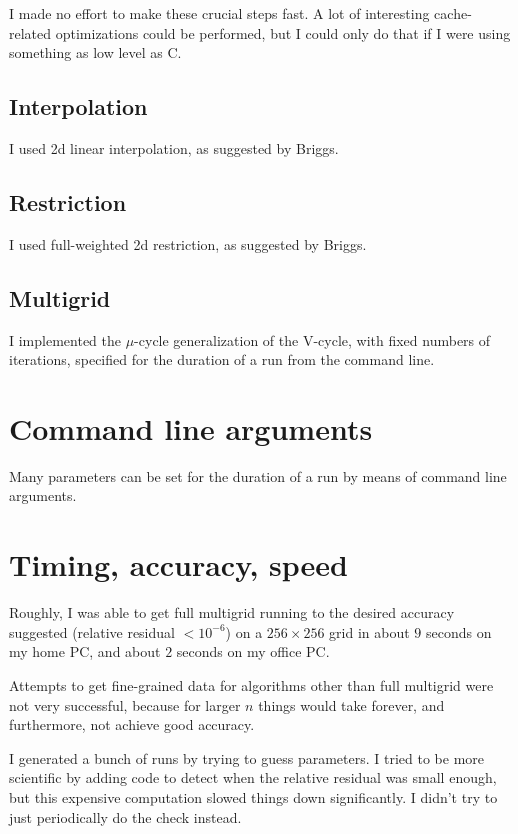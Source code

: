 \documentclass[titlepage,twoside]{article}
\begin{document}
I made no effort to make these crucial steps fast.  A lot of
interesting cache-related optimizations could be performed, but I
could only do that if I were using something as low level as C.


\subsection{Interpolation}
\label{sec:interpolation}

I used 2d linear interpolation, as suggested by Briggs.


\subsection{Restriction}

I used full-weighted 2d restriction, as suggested by Briggs.


\subsection{Multigrid}

I implemented the $\mu$-cycle generalization of the V-cycle, with fixed
numbers of iterations, specified for the duration of a run from the
command line.


\clearpage
\section{Command line arguments}
\label{sec:command-line}

Many parameters can be set for the duration of a run by means of
command line arguments.






\clearpage
\section{Timing, accuracy, speed}
\label{sec:timing}

Roughly, I was able to get full multigrid running to the desired
accuracy suggested (relative residual $< 10^{-6}$) on a $256 \times 256$
grid in about $9$ seconds on my home PC, and about $2$ seconds on my
office PC.

Attempts to get fine-grained data for algorithms other than full
multigrid were not very successful, because for larger $n$ things
would take forever, and furthermore, not achieve good accuracy.

I generated a bunch of runs by trying to guess parameters.  I tried to
be more scientific by adding code to detect when the relative residual
was small enough, but this expensive computation slowed things down
significantly.  I didn't try to just periodically do the check
instead.
\end{document}
